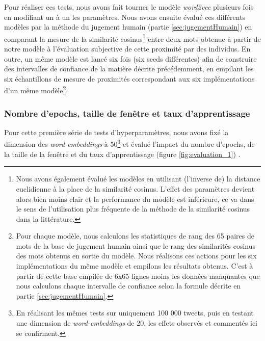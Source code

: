 \documentclass[11pt,french,french]{article}
\let\rmarkdownfootnote\footnote%
\def\footnote{\protect\rmarkdownfootnote}
\begin{document}
Pour réaliser ces tests, nous avons fait tourner le modèle \emph{word2vec} plusieurs fois en modifiant un à un les paramètres. Nous avons ensuite évalué ces différents modèles par la méthode du \og jugement humain \fg{} (partie \ref{sec:jugementHumain}) en comparant la mesure de la similarité cosinus\footnote{Nous avons également évalué les modèles en utilisant (l'inverse de) la distance euclidienne à la place de la similarité cosinus.
  L'effet des paramètres devient alors bien moins clair et la performance du modèle est inférieure, ce va dans le sens de l'utilisation plus fréquente de la méthode de la similarité cosinus dans la littérature.}
entre deux mots obtenue à partir de notre modèle à l'évaluation subjective de cette proximité par des individus.
En outre, un même modèle est lancé six fois (six \og seeds \fg{} différentes) afin de construire des intervalles de confiance de la matière décrite précédemment, en empilant les six échantillons de mesure de proximités correspondant aux six implémentations d'un même modèle\footnote{Pour chaque modèle, nous calculons les statistiques de rang des 65 paires de mots de la base de jugement humain ainsi que le rang des similarités cosinus des mots obtenus en sortie du modèle.
  Nous réalisons ces actions pour les six implémentations du même modèle et empilons les résultats obtenus.
  C'est à partir de cette base empilée de 6x65 lignes moins les données manquantes que nous calculons chaque intervalle de confiance selon la formule décrite en partie \ref{sec:jugementHumain}.}.

\hypertarget{nombre-depochs-taille-de-fenuxeatre-et-taux-dapprentissage}{%
\subsubsection{Nombre d'epochs, taille de fenêtre et taux d'apprentissage}\label{nombre-depochs-taille-de-fenuxeatre-et-taux-dapprentissage}}

Pour cette première série de tests d'hyperparamètres, nous avons fixé la dimension des \emph{word-embeddings} à 50\footnote{En réalisant les mêmes tests sur uniquement 100 000 tweets, puis en testant une dimension de \emph{word-embeddings} de 20, les effets observés et commentés ici se confirment.} et évalué l'impact du nombre d'epochs, de la taille de la fenêtre et du taux d'apprentissage (figure \ref{fig:evaluation_1}) .
\end{document}
